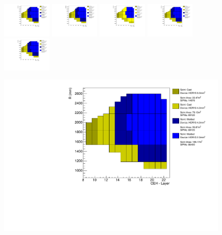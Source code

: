 \begin{figure}[!ht]
  \centering
  \includegraphics[trim={405 370 20 10},clip,width=0.212\textwidth]{figures/hgcal/plot_scenes/sceneA_jan20_fix_vto2p0_with9mm2.pdf} \hspace{-15pt}
  \includegraphics[trim={405 310 20 70},clip,width=0.212\textwidth]{figures/hgcal/plot_scenes/sceneA_jan20_fix_vto2p0_with9mm2.pdf} \hspace{-15pt}
  \includegraphics[trim={405 250 20 130},clip,width=0.212\textwidth]{figures/hgcal/plot_scenes/sceneB_jan20_fix_vto2p0_with9mm2.pdf} \hspace{-15pt}
  \includegraphics[trim={405 250 20 130},clip,width=0.212\textwidth]{figures/hgcal/plot_scenes/sceneA_jan20_fix_vto2p0_with9mm2.pdf} \hspace{-15pt}
  \includegraphics[trim={405 190 20 190},clip,width=0.212\textwidth]{figures/hgcal/plot_scenes/sceneA_jan20_fix_vto2p0_with9mm2.pdf} \hspace{-15pt}
  \begin{minipage}[c]{0.49\textwidth}
    \includegraphics[trim={0 0 165pt 0},clip,width=\textwidth]{figures/hgcal/plot_scenes/sceneA_jan20_fix_vto2p0_with9mm2.pdf}

\end{minipage}
\end{figure}
